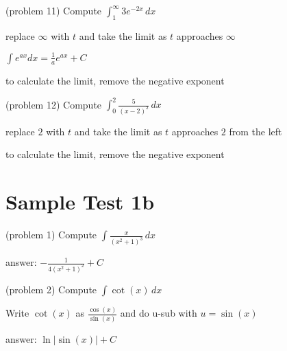 \documentclass[handout]{ximera}
\begin{document}
\begin{problem}(problem 11)
Compute $\displaystyle \int_1^\infty 3e^{-2x} \, dx$

\begin{hint}
replace $\infty$ with $t$ and take the limit as $t$ approaches $\infty$
\end{hint}

\begin{hint}
$\displaystyle \int e^{ax} dx = \frac{1}{a} e^{ax} + C$
\end{hint}

\begin{hint}
to calculate the limit, remove the negative exponent
\end{hint}

\end{problem}


\begin{problem}(problem 12)
Compute $\displaystyle \int_{0}^2 \frac{5}{(x-2)^2} \, dx$

\begin{hint}
replace $2$ with $t$ and take the limit as $t$ approaches $2$ from the left
\end{hint}


\begin{hint}
to calculate the limit, remove the negative exponent
\end{hint}


\end{problem}




\section{Sample Test 1b}

\begin{problem}(problem 1)
Compute $\displaystyle \int \frac{x}{(x^2+1)^3} \, dx$

\begin{hint}
answer: $\displaystyle -\frac{1}{4(x^2+1)^2} + C$
\end{hint}

\end{problem}

\begin{problem}(problem 2)
Compute $\displaystyle \int \cot(x) \, dx$

\begin{hint}
Write $\cot(x)$ as $\frac{\cos(x)}{\sin(x)}$ and do u-sub with $u = \sin(x)$
\end{hint}

\begin{hint}
answer: $\ln|\sin(x)| + C$
\end{hint}

\end{problem}
\end{document}
